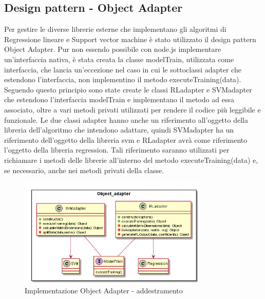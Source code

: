 \documentclass[../manuale-sviluppatore.tex]{subfiles}
\begin{document}
\subsection{Design pattern - Object Adapter}
\label{ssec:design_pattern_object_adapter}
Per gestire le diverse librerie esterne che implementano gli algoritmi di Regressione lineare e Support vector machine è stato utilizzato il design pattern Object Adapter.
Pur non essendo possibile con node.js implementare un'interfaccia nativa, è stata creata la classe modelTrain, utilizzata come interfaccia, che lancia un'eccezione nel caso
in cui le sottoclassi adapter che estendono l'interfaccia, non implementino il metodo executeTraining(data).
Seguendo questo principio sono state create le classi RLadapter e SVMadapter che estendono l'interfaccia modelTrain e implementano il metodo ad essa associato, oltre a vari metodi privati
utilizzati per rendere il codice più leggibile e funzionale.
Le due classi adapter hanno anche un riferimento all'oggetto della libreria dell'algoritmo che intendono adattare, quindi SVMadapter ha un riferimento dell'oggetto della libreria svm e
RLadapter avrà come riferimento l'oggetto della libreria regression. Tali riferimento saranno utilizzati per richiamare i metodi delle librerie all'interno del metodo executeTraining(data)
e, se necessario, anche nei metodi privati della classe.

\begin{figure}[H]
    \begin{center}
         \includegraphics[width=9cm]{img/objectAdapterTA.png}
         \caption{Implementazione Object Adapter - addestramento}
         \label{fig:object_adapter}
     \end{center}
 \end{figure}
\end{document}
